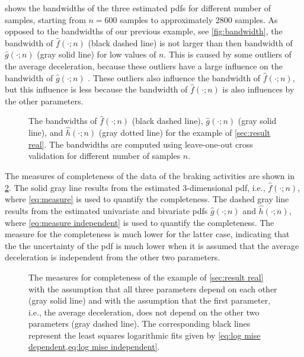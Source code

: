  shows the bandwidths of the three estimated pdfs for different number of samples, starting from $n=600$ samples to approximately 2800 samples. As opposed to the bandwidths of our previous example, see \cref{fig:bandwidth}, the bandwidth of $\hat{f}(\cdot;n)$ (black dashed line) is not larger than then bandwidth of $\hat{g}(\cdot;n)$ (gray solid line) for low values of $n$. This is caused by some outliers of the average deceleration, because these outliers have a large influence on the bandwidth of $\hat{g}(\cdot;n)$ \cite{hall1992global}. These outliers also influence the bandwidth of $\hat{f}(\cdot;n)$, but this influence is less because the bandwidth of $\hat{f}(\cdot;n)$ is also influences by the other parameters.

\setlength{}
\setlength{}
\begin{figure}
	\centering
	
	\caption{The bandwidths of $\hat{f}(\cdot;n)$ (black dashed line), $\hat{g}(\cdot;n)$ (gray solid line), and $\hat{h}(\cdot;n)$ (gray dotted line) for the example of \cref{sec:result real}. The bandwidths are computed using leave-one-out cross validation for different number of samples $n$.}
	\label{fig:bandwidth real}
\end{figure}

The measures of completeness of the data of the braking activities are shown in \cref{fig:mise real}. The solid gray line results from the estimated 3-dimensional pdf, i.e., $\hat{f}(\cdot;n)$, where \cref{eq:measure} is used to quantify the completeness. The dashed gray line results from the estimated univariate and bivariate pdfs $\hat{g}(\cdot;n)$ and $\hat{h}(\cdot;n)$, where \cref{eq:measure independent} is used to quantify the completeness. The measure for the completeness is much lower for the latter case, indicating that the the uncertainty of the pdf is much lower when it is assumed that the average deceleration is independent from the other two parameters.

\setlength\figurewidth{\linewidth}
\setlength\figureheight{\linewidth}
\begin{figure}
	\centering
	
	\caption{The measures for completeness of the example of \cref{sec:result real} with the assumption that all three parameters depend on each other (gray solid line) and with the assumption that the first parameter, i.e., the average deceleration, does not depend on the other two parameters (gray dashed line). The corresponding black lines represent the least squares logarithmic fits given by \cref{eq:log mise dependent,eq:log mise independent}.}
	\label{fig:mise real}
\end{figure}

